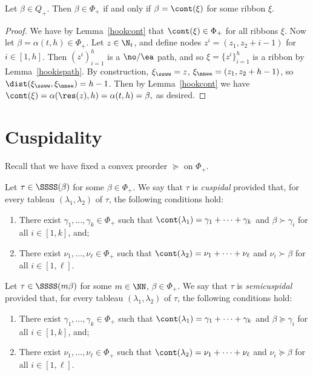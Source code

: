 \begin{coro}\label{skewpos}
Let \(\beta \in Q_+\). Then \(\beta \in \Phi_+\) if and only if \(\beta = \cont(\xi)\) for some ribbon \(\xi\).
\end{coro}
\begin{proof}
We have by Lemma~\ref{hookcont} that \(\cont(\xi) \in \Phi_+\) for all ribbons \(\xi\). Now let \(\beta = \alpha(t,h) \in \Phi_+\). Let \(z \in \N_t\), and define nodes \(z^i = (z_1, z_2 + i-1)\) for \(i \in [1,h]\). Then \((z^i)_{i=1}^h\) is a \(\no/\ea\) path, and so \(\xi = \{z^i\}_{i=1}^h\) is a ribbon by Lemma~\ref{hookispath}. By construction, \(\xi_{\ssww} = z\), \(\xi_{\nnee} = (z_1, z_2+h-1)\), so \(\dist(\xi_{\ssww}, \xi_{\nnee}) = h-1\). Then by Lemma~\ref{hookcont} we have
\(
\cont(\xi) = \alpha(\res(z), h) = \alpha(t,h) = \beta,
\)
as desired.
\end{proof}

\section{Cuspidality}
Recall that we have fixed a convex preorder \(\succeq\) on \(\Phi_+\).
\begin{defi}\label{cuspdef}
Let \(\tau \in \SSSS(\beta)\) for some \(\beta \in \Phi_+\). We say that \(\tau\) is {\em cuspidal} provided that, for every tableau \((\lambda_1, \lambda_2)\) of \(\tau\), the following conditions hold:
\begin{enumerate}
\item There exist \(\gamma_1, \ldots, \gamma_k \in \Phi_+\) such that \(\cont(\lambda_1) = \gamma_1 + \cdots + \gamma_k\) and \(\beta \succ \gamma_i\) for all \(i \in [1,k]\), and; \label{cond:cuspdef1}
\item There exist \(\nu_1, \ldots, \nu_\ell \in \Phi_+\) such that \(\cont(\lambda_2) = \nu_1 + \cdots + \nu_\ell\) and \(\nu_i \succ \beta\) for all \(i \in [1,\ell]\). \label{cond:cuspdef2}
\end{enumerate}
\end{defi}

\begin{defi}\label{semicuspdef}
Let \( \tau \in \SSSS(m \beta)\) for some \(m \in \NN\), \(\beta \in \Phi_+\). We say that \(\tau\) is {\em semicuspidal} provided that, for every tableau \((\lambda_1, \lambda_2)\) of \(\tau\), the following conditions hold:
\begin{enumerate}
\item There exist \(\gamma_1, \ldots, \gamma_k \in \Phi_+\) such that \(\cont(\lambda_1) = \gamma_1 + \cdots + \gamma_k\) and \(\beta \succeq \gamma_i\) for all \(i \in [1,k]\), and;
\item There exist \(\nu_1, \ldots, \nu_\ell \in \Phi_+\) such that \(\cont(\lambda_2) = \nu_1 + \cdots + \nu_\ell\) and \(\nu_i \succeq \beta\) for all \(i \in [1,\ell]\).
\end{enumerate}
\end{defi}

